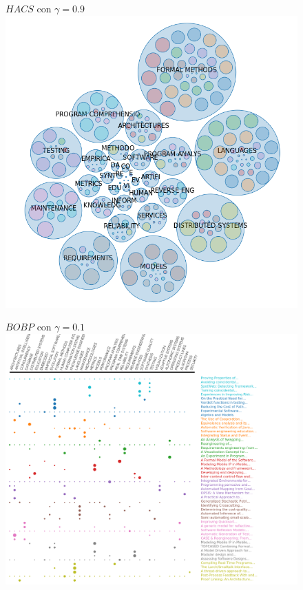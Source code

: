 \begin{figure}[H]
	\centering
	$HACS$ con $\gamma=0.9$ \\
	\includegraphics[width=0.80\linewidth, height=\textheight,keepaspectratio]{img/gamma-09-burbujas-alg-1.png}
	\caption{}
	\label{res:gamma09-bur-alg-1}
\end{figure}

\begin{figure}[H]
	\centering
	$BOBP$ con $\gamma=0.1$ \\
	\includegraphics[width=0.80\linewidth]{img/gamma-01-alg-3.png}
	\caption{}
	\label{res:gamma01-alg-1}
\end{figure}


